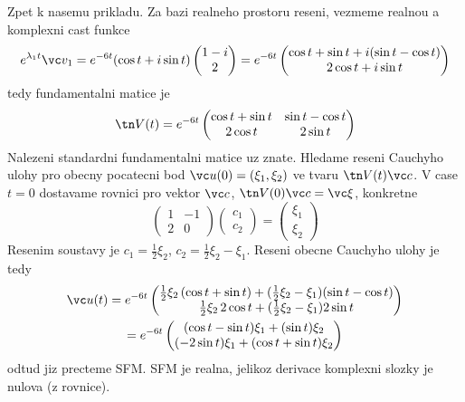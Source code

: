 Zpet k nasemu prikladu. Za bazi realneho prostoru reseni, vezmeme 
realnou a komplexni cast funkce 
\[
  e^{\lambda_1 t} \vc v_1
  =e^{-6t}(\cos t+i\sin t)\begin{pmatrix}1-i\\2\end{pmatrix}
  =e^{-6t}\begin{pmatrix}\cos t+\sin t+i(\sin t-\cos t)\\
   2\cos t+i \sin t\end{pmatrix}
\]
tedy fundamentalni matice je 
\[
  \tn V(t)=e^{-6t}\begin{pmatrix}\cos t+\sin t& \sin t-\cos t\\
                    2\cos t& 2\sin t
                  \end{pmatrix}
\]
Nalezeni standardni fundamentalni matice uz znate. Hledame reseni Cauchyho ulohy
pro obecny pocatecni bod $\vc u(0)=(\xi_1,\xi_2)$ ve tvaru $\tn V(t)\vc c$.
V case $t=0$ dostavame rovnici pro vektor $\vc c$, $\tn V(0)\vc c=\vc \xi$, konkretne
\[
  \begin{pmatrix} 1&-1\\2&0\end{pmatrix}\begin{pmatrix}c_1 \\ c_2\end{pmatrix}=
                                        \begin{pmatrix}\xi_1\\ \xi_2
                                      \end{pmatrix}
\]
Resenim soustavy je $c_1=\frac12\xi_2$, $c_2=\frac12\xi_2-\xi_1$. Reseni obecne Cauchyho ulohy je tedy
\begin{multline*}
  \vc u(t)=e^{-6t}\begin{pmatrix}
     \frac12\xi_2\,(\cos t+\sin t)+(\frac12\xi_2-\xi_1)(\sin t-\cos t)\\
    \frac12\xi_2\,2\cos t+(\frac12\xi_2-\xi_1)2\sin t
                  \end{pmatrix}\\
   =e^{-6t}\begin{pmatrix}
             (\cos t-\sin t)\xi_1+(\sin t)\xi_2\\
             (-2\sin t)\xi_1+(\cos t+\sin t)\xi_2
           \end{pmatrix}
\end{multline*}
odtud jiz precteme SFM. SFM je realna, jelikoz derivace komplexni slozky je nulova (z rovnice).


